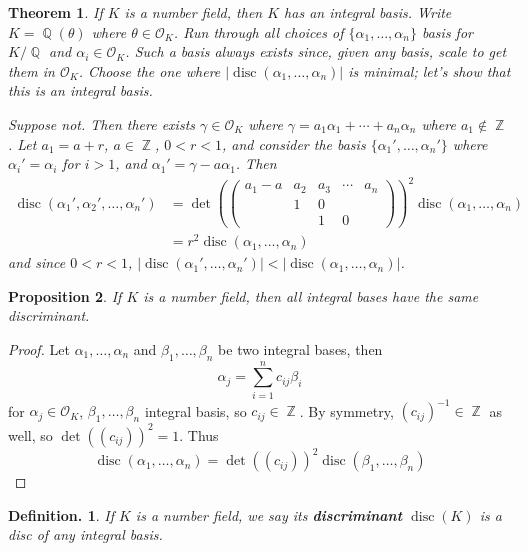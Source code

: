 \documentclass[11pt, a4paper]{memoir}
\DeclareMathOperator{\Q}{{\mathbb{Q}}}
\DeclareMathOperator{\Z}{{\mathbb{Z}}}
\theoremstyle{change}
\newtheorem{theorem}{Theorem}[section]
\newtheorem{proposition}[theorem]{Proposition}
\theoremstyle{plain}
\theoremstyle{nonumberplain}
\newtheorem{definition}{Definition.}
\newtheorem{proof}{Proof}
\DeclareMathOperator{\disc}{disc}
\begin{document}
\begin{theorem}
    If $K$ is a number field, then $K$ has an integral basis.
    Write $K=\Q(\theta)$ where $\theta\in\mathcal{O}_K$.
    Run through all choices of $\{\alpha_1,\ldots,\alpha_n\}$ basis for $K/\Q$ and $\alpha_i\in\mathcal{O}_K$.
    Such a basis always exists since, given any basis, scale to get them in $\mathcal{O}_K$.
    Choose the one where $|\disc(\alpha_1,\ldots,\alpha_n)|$ is minimal; let's show that this is an integral basis.

    Suppose not.
    Then there exists $\gamma\in\mathcal{O}_K$ where $\gamma=a_1\alpha_1+\cdots+a_n\alpha_n$ where $a_1\notin\Z$.
    Let $a_1=a+r$, $a\in\Z$, $0<r<1$, and consider the basis $\{\alpha_1',\ldots,\alpha_n'\}$ where $\alpha_i'=\alpha_i$ for $i>1$, and $\alpha_1'=\gamma-a\alpha_1$.
    Then
    \begin{align*}
        \disc(\alpha_1',\alpha_2',\ldots,\alpha_n') &= \det\left(\begin{pmatrix}a_1-a&a_2&a_3&\cdots&a_n\\&1&0&&\\&&1&0\end{pmatrix}\right)^2\disc(\alpha_1,\ldots,\alpha_n)\\
                                                         &= r^2\disc(\alpha_1,\ldots,\alpha_n)
    \end{align*}
    and since $0<r<1$, $|\disc(\alpha_1',\ldots,\alpha_n')|<|\disc(\alpha_1,\ldots,\alpha_n)|$.
\end{theorem}
\begin{proposition}
    If $K$ is a number field, then all integral bases have the same discriminant.
\end{proposition}
\begin{proof}
    Let $\alpha_1,\ldots,\alpha_n$ and $\beta_1,\ldots,\beta_n$ be two integral bases, then
    \begin{equation*}
        \alpha_j=\sum\limits_{i=1}^n c_{ij}\beta_i
    \end{equation*}
    for $\alpha_j\in\mathcal{O}_K$, $\beta_1,\ldots,\beta_n$ integral basis, so $c_{ij}\in\Z$.
    By symmetry, $(c_{ij})^{-1}\in\Z$ as well, so $\det((c_{ij}))^2=1$.
    Thus
    \begin{equation*}
        \disc(\alpha_1,\ldots,\alpha_n)=\det((c_{ij}))^2\disc(\beta_1,\ldots,\beta_n)
    \end{equation*}
\end{proof}
\begin{definition}
    If $K$ is a number field, we say its \textbf{discriminant} $\disc(K)$ is a disc of any integral basis.
\end{definition}
\end{document}
